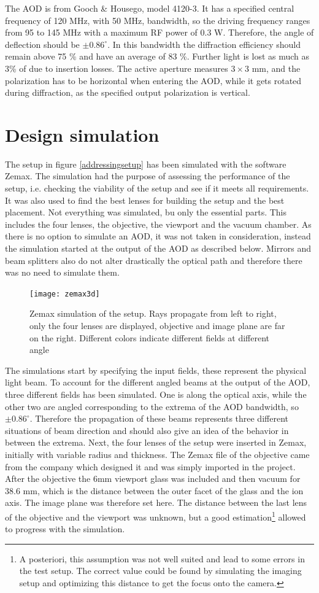 The AOD is from Gooch \& Housego, model 4120-3. It has a specified central frequency of 120 MHz, with 50 MHz, bandwidth, so the driving frequency ranges from 95 to 145 MHz with a maximum RF power of 0.3 W. Therefore, the angle of deflection should be $\pm 0.86^{\circ}$.  In this bandwidth the diffraction efficiency should remain above 75 \% and have an average of 83 \%. Further light is lost as much as 3\% of due to insertion losses. The active aperture measures $3\times 3$ mm, and the polarization has to be horizontal when entering the AOD, while it gets rotated during diffraction, as the specified output polarization is vertical.

\section{Design simulation}
The setup in figure \ref{addressingsetup} has been simulated with the software Zemax. The simulation had the purpose of assessing the performance of the setup, i.e. checking the viability of the setup and see if it meets all requirements. It was also used to find the best lenses for building the setup and the best placement. Not everything was simulated, bu only the essential parts. This includes the four lenses, the objective, the viewport and the vacuum chamber. As there is no option to simulate an AOD, it was not taken in consideration, instead the simulation started at the output of the AOD as described below. Mirrors and beam splitters also do not alter drastically the optical path and therefore there was no need to simulate them.
\begin{figure}[H]
\centering
\texttt{[image: zemax3d]}
\caption{Zemax simulation of the setup. Rays propagate from left to right, only the four lenses are displayed, objective and image plane are far on the right. Different colors indicate different fields at different angle}
\label{zemaxview}
\end{figure}
The simulations start by specifying the input fields, these represent the physical light beam. To account for the different angled beams at the output of the AOD, three different fields has been simulated. One is along the optical axis, while the other two are angled corresponding to the extrema of the AOD bandwidth, so $\pm0.86^{\circ}$. Therefore the propagation of these beams represents three different situations of beam direction and should also give an idea of the behavior in between the extrema. Next, the four lenses of the setup were inserted in Zemax, initially with variable radius and thickness. The Zemax file of the objective came from the company which designed it and was simply imported in the project. After the objective the 6mm viewport glass was included and then vacuum for 38.6 mm, which is the distance between the outer facet of the glass and the ion axis. The image plane was therefore set here. The distance between the last lens of the objective and the viewport was unknown, but a good estimation\footnote{A posteriori, this assumption was not well suited and lead to some errors in the test setup. The correct value could be found by simulating the imaging setup and optimizing this distance to get the focus onto the camera.} allowed to progress with the simulation.
